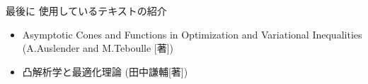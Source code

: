 \documentclass[aspectratio=169, dvipdfmx, 11pt]{beamer} %
\begin{document}
\begin{frame}{最後に }
  使用しているテキストの紹介
  \begin{itemize}
  \item Asymptotic Cones and Functions in Optimization and Variational Inequalities (A.Auslender and M.Teboulle [著])
  \item 凸解析学と最適化理論 (田中謙輔[著])
  \end{itemize}
\end{frame}
\end{document}
